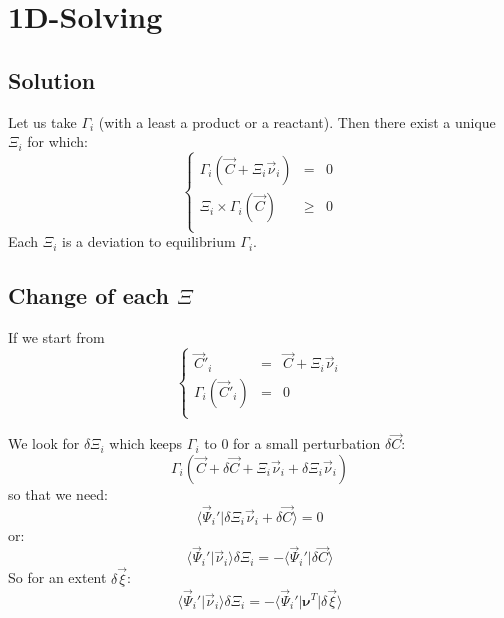 \documentclass[aps,12pt]{revtex4}
\begin{document}
\section{1D-Solving}

\subsection{Solution}
Let us take $\Gamma_i$ (with a least a product or a reactant).
Then there exist a unique $\Xi_i$ for which:
\begin{equation}
\left\lbrace
\begin{array}{rcl}
	\Gamma_i(\vec{C} + \Xi_i \vec{\nu}_i ) & = & 0\\
	 \Xi_i \times \Gamma_i(\vec{C}) &\geq  &0\\
\end{array}
\right.
\end{equation}
Each $\Xi_i$ is a deviation to equilibrium $\Gamma_i$.

\subsection{Change of each $\Xi$}
If we start from
\begin{equation}
\left\lbrace
\begin{array}{rcl}
	\vec{C}'_i & = & \vec{C} + \Xi_i \vec{\nu}_i\\
	\Gamma_i(\vec{C}'_i) & = & 0\\
\end{array}
\right.
\end{equation}

We look for $\delta \Xi_i$ which keeps $\Gamma_i$ to $0$ for a small perturbation $\delta\vec{C}$:
\begin{equation}
	\Gamma_i\left( \vec{C} + \delta\vec{C} + \Xi_i \vec{\nu}_i + \delta \Xi_i \vec{\nu}_i \right)
\end{equation}
so that we need:
\begin{equation}
	\langle \vec{\Psi}_i' \vert  \delta \Xi_i \vec{\nu}_i + \delta\vec{C} \rangle = 0
\end{equation}
or:
\begin{equation}
	\langle \vec{\Psi}_i' \vert  \vec{\nu}_i  \rangle  \delta \Xi_i = - \langle \vec{\Psi}_i' \vert \delta\vec{C} \rangle 
 \end{equation}
So for an extent $\delta\vec{\xi}$:
\begin{equation}
	\langle \vec{\Psi}_i' \vert  \vec{\nu}_i  \rangle  \delta \Xi_i = - \langle \vec{\Psi}_i' \vert \bm{\nu}^T \vert \delta\vec{\xi} \rangle 
\end{equation}
\end{document}
